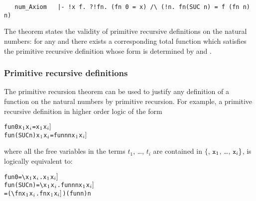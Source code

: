 {{\begin{hol}
\begin{verbatim}
   num_Axiom   |- !x f. ?!fn. (fn 0 = x) /\ (!n. fn(SUC n) = f (fn n) n)
\end{verbatim}\end{hol}

\noindent The theorem states the validity of primitive recursive
definitions on the natural numbers: for any  and  there exists a
corresponding total function  which satisfies
the primitive recursive definition whose form is determined by  and
.

\subsubsection{Primitive recursive definitions}\label{num-prim-rec}

The primitive recursion theorem 
can be used to justify any  definition of a
function on the  natural numbers  by primitive  recursion.   For example, a
primitive recursive definition in higher order
logic of the form

\begin{hol}\begin{alltt}
   fun 0       x\(\sb{1}\) \m{\dots} x\(\sb{i}\) = \m{f\sb{1}[}x\(\sb{1}\)\m{,\ldots,\,} x\(\sb{i}]\) 
   fun (SUC n) x\(\sb{1}\) \m{\dots} x\(\sb{i}\) = \m{f\sb{2}[}fun n  n\m{,} x\(\sb{1}\)\m{,\ldots,\,}x\(\sb{i}]\)
\end{alltt}\end{hol}

\noindent where all the free variables in the  terms $t_1$,  
\dots, $t_i$ are contained in $\{$, $\ml{x}_1$, \dots, $\ml{x}_i\}$, 
is logically equivalent to:

\begin{hol}\begin{alltt}
   fun 0       = \verb!\!x\(\sb{1}\) \m{\dots} x\(\sb{i}\).\m{f\sb{1}[}x\(\sb{1}\)\m{,\ldots,\,}x\(\sb{i}]\)
   fun (SUC n) = \verb!\!x\(\sb{1}\) \m{\dots} x\(\sb{i}\).\m{f\sb{2}[}fun n  n\m{,}x\(\sb{1}\)\m{,\ldots,\,}x\(\sb{i}]\)
               = (\verb!\!f n x\(\sb{1}\) \m{\dots} x\(\sb{i}\).\m{f\sb{2}[}f  n\m{,} x\(\sb{1}\)\m{,\ldots,\,}x\(\sb{i}]\)) (fun n) n
\end{alltt}\end{hol}

}}
